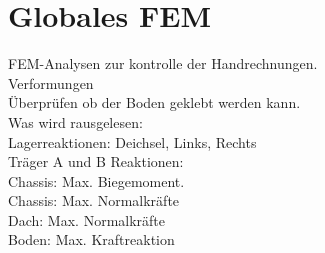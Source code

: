 \section{Globales FEM}

FEM-Analysen zur kontrolle der Handrechnungen.\\
Verformungen\\
Überprüfen ob der Boden geklebt werden kann.\\

Was wird rausgelesen:\\
Lagerreaktionen: Deichsel, Links, Rechts\\
Träger A und B Reaktionen:\\
Chassis: Max. Biegemoment.\\
Chassis: Max. Normalkräfte\\
Dach: Max. Normalkräfte\\
Boden: Max. Kraftreaktion\\


